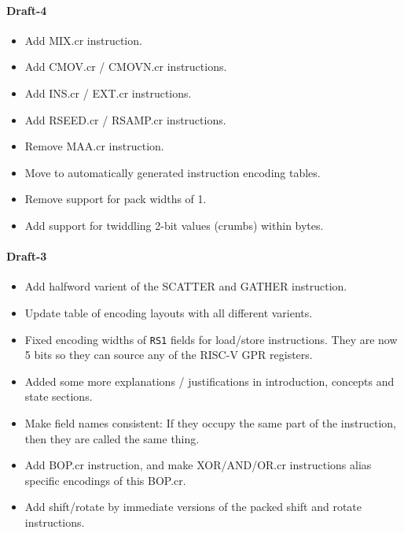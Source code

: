 \paragraph{Draft-4}
\begin{itemize}
\item Add MIX.cr instruction.
\item Add CMOV.cr / CMOVN.cr instructions.
\item Add INS.cr / EXT.cr instructions.
\item Add RSEED.cr / RSAMP.cr instructions.
\item Remove MAA.cr instruction.
\item Move to automatically generated instruction encoding tables.
\item Remove support for pack widths of 1.
\item Add support for twiddling 2-bit values (crumbs) within bytes.
\end{itemize}

\paragraph{Draft-3}
\begin{itemize}
\item Add halfword varient of the SCATTER and GATHER instruction.
\item Update table of encoding layouts with all different varients.
\item Fixed encoding widths of {\tt RS1} fields for load/store
    instructions. They are now 5 bits so they can source any of the
    RISC-V GPR registers.
\item Added some more explanations / justifications in introduction,
    concepts and state sections.
\item Make field names consistent: If they occupy the same part of
    the instruction, then they are called the same thing.
\item Add BOP.cr instruction, and make XOR/AND/OR.cr instructions
    alias specific encodings of this BOP.cr.
\item Add shift/rotate by immediate versions of the packed
    shift and rotate instructions.
\end{itemize}

